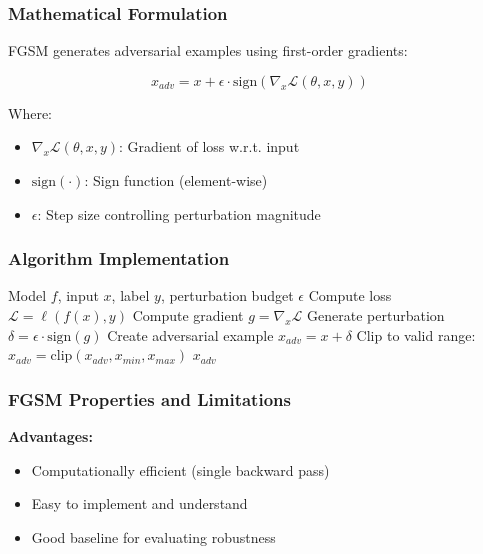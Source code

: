 \documentclass[conference]{IEEEtran}
\begin{document}
\subsubsection{Mathematical Formulation}
\label{sec:q4_fgsm_math}

FGSM generates adversarial examples using first-order gradients:

\begin{equation}
x_{adv} = x + \epsilon \cdot \mathrm{sign}(\nabla_x \mathcal{L}(\theta, x, y))
\end{equation}

Where:
\begin{itemize}
  \item $\nabla_x \mathcal{L}(\theta, x, y)$: Gradient of loss w.r.t. input
  \item $\mathrm{sign}(\cdot)$: Sign function (element-wise)
  \item $\epsilon$: Step size controlling perturbation magnitude
\end{itemize}

\subsubsection{Algorithm Implementation}
\label{sec:q4_fgsm_algorithm}

\begin{algorithm}[H]
\caption{FGSM Attack}
\begin{algorithmic}[1]
\Require Model $f$, input $x$, label $y$, perturbation budget $\epsilon$
\State Compute loss $\mathcal{L} = \ell(f(x), y)$
\State Compute gradient $g = \nabla_x \mathcal{L}$
  \State Generate perturbation $\delta = \epsilon \cdot \mathrm{sign}(g)$
\State Create adversarial example $x_{adv} = x + \delta$
  \State Clip to valid range: $x_{adv} = \mathrm{clip}(x_{adv}, x_{min}, x_{max})$
\Ensure $x_{adv}$
\end{algorithmic}
\end{algorithm}

\subsubsection{FGSM Properties and Limitations}
\label{sec:q4_fgsm_properties}

\textbf{Advantages:}
\begin{itemize}
  \item Computationally efficient (single backward pass)
  \item Easy to implement and understand
  \item Good baseline for evaluating robustness
\end{itemize}
\end{document}

